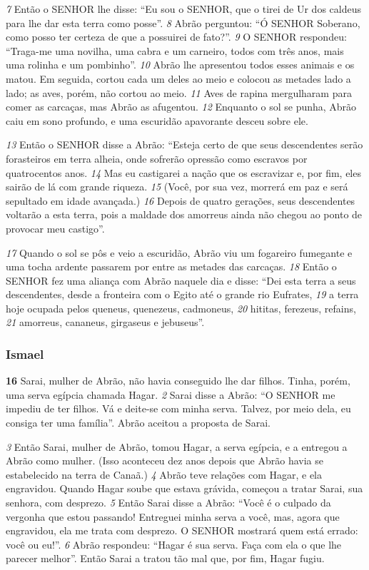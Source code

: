 \bigskip
\textit{\tiny 7}
Então o SENHOR lhe disse: “Eu sou o SENHOR, que o tirei de Ur dos caldeus para
lhe dar esta terra como posse”.
\textit{\tiny 8}
Abrão perguntou: “Ó SENHOR Soberano, como posso ter certeza de que a
possuirei de fato?”.
\textit{\tiny 9}
O SENHOR respondeu: “Traga-me uma novilha, uma cabra e um carneiro, todos
com três anos, mais uma rolinha e um pombinho”. 
\textit{\tiny 10}
Abrão lhe apresentou todos
esses animais e os matou. Em seguida, cortou cada um deles ao meio e colocou as
metades lado a lado; as aves, porém, não cortou ao meio. 
\textit{\tiny 11}
Aves de rapina
mergulharam para comer as carcaças, mas Abrão as afugentou.
\textit{\tiny 12}
Enquanto  o sol se punha, Abrão caiu em sono profundo, e uma escuridão
apavorante desceu sobre ele. 

\bigskip
\textit{\tiny 13}
Então o SENHOR disse a Abrão: “Esteja certo de que
seus descendentes serão forasteiros em terra alheia, onde sofrerão opressão
como escravos por quatrocentos anos. 
\textit{\tiny 14}
Mas eu castigarei a nação que os
escravizar e, por fim, eles sairão de lá com grande riqueza. 
\textit{\tiny 15}
(Você, por sua vez,
morrerá em paz e será sepultado em idade avançada.) 
\textit{\tiny 16}
Depois de quatro
gerações, seus descendentes voltarão a esta terra, pois a maldade dos amorreus
ainda não chegou ao ponto de provocar meu castigo”.

\bigskip
\textit{\tiny 17}
Quando o sol se pôs e veio a escuridão, Abrão viu um fogareiro fumegante e
uma tocha ardente passarem por entre as metades das carcaças. 
\textit{\tiny 18}
Então o SENHOR
fez uma aliança com Abrão naquele dia e disse: “Dei esta terra a seus
descendentes, desde a fronteira com o Egito até o grande rio Eufrates, 
\textit{\tiny 19}
a terra
hoje ocupada pelos queneus, quenezeus, cadmoneus, 
\textit{\tiny 20}
hititas, ferezeus, refains,
\textit{\tiny 21}
amorreus, cananeus, girgaseus e jebuseus”.

\bigskip
\subsubsection*{Ismael}
\textbf{\large 16}
 Sarai, mulher de Abrão, não havia conseguido lhe dar filhos. Tinha, porém,
uma serva egípcia chamada Hagar. 
\textit{\tiny 2}
Sarai disse a Abrão: “O SENHOR me impediu de
ter filhos. Vá e deite-se com minha serva. Talvez, por meio dela, eu consiga ter
uma família”. Abrão aceitou a proposta de Sarai. 

\bigskip
\textit{\tiny 3}
Então Sarai, mulher de Abrão,
tomou Hagar, a serva egípcia, e a entregou a Abrão como mulher. (Isso aconteceu
dez anos depois que Abrão havia se estabelecido na terra de Canaã.)
\textit{\tiny 4}
Abrão teve relações com Hagar, e ela engravidou. Quando Hagar soube que
estava grávida, começou a tratar Sarai, sua senhora, com desprezo. 
\textit{\tiny 5}
Então Sarai
disse a Abrão: “Você é o culpado da vergonha que estou passando! Entreguei
minha serva a você, mas, agora que engravidou, ela me trata com desprezo. O
SENHOR mostrará quem está errado: você ou eu!”.
\textit{\tiny 6}
Abrão respondeu: “Hagar é sua serva. Faça com ela o que lhe parecer melhor”.
Então Sarai a tratou tão mal que, por fim, Hagar fugiu.

